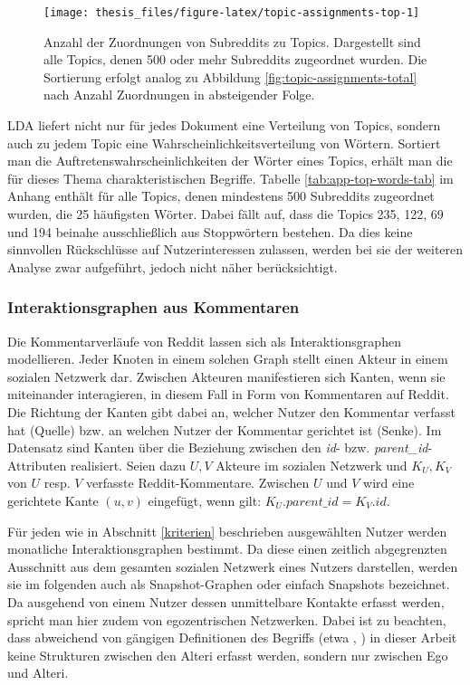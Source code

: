 \documentclass[11pt,a4paper,twoside]{article}
\begin{document}
\begin{figure}

{\centering \texttt{[image: thesis\_files/figure-latex/topic-assignments-top-1]} 

}

\caption{Anzahl der Zuordnungen von Subreddits zu
Topics. Dargestellt sind alle Topics, denen 500 oder mehr Subreddits
zugeordnet wurden. Die Sortierung erfolgt analog zu Abbildung
\ref{fig:topic-assignments-total} nach Anzahl Zuordnungen in
absteigender Folge.}\label{fig:topic-assignments-top}
\end{figure}

LDA liefert nicht nur für jedes Dokument eine Verteilung von Topics,
sondern auch zu jedem Topic eine Wahrscheinlichkeitsverteilung von
Wörtern. Sortiert man die Auftretenswahrscheinlichkeiten der Wörter
eines Topics, erhält man die für dieses Thema charakteristischen
Begriffe. Tabelle \ref{tab:app-top-words-tab} im Anhang enthält für alle
Topics, denen mindestens 500 Subreddits zugeordnet wurden, die 25
häufigsten Wörter. Dabei fällt auf, dass die Topics 235, 122, 69 und 194
beinahe ausschließlich aus Stoppwörtern bestehen. Da dies keine
sinnvollen Rückschlüsse auf Nutzerinteressen zulassen, werden bei sie
der weiteren Analyse zwar aufgeführt, jedoch nicht näher berücksichtigt.

\hypertarget{interaktionsgraphen-aus-kommentaren}{%
\subsubsection{Interaktionsgraphen aus
Kommentaren}\label{interaktionsgraphen-aus-kommentaren}}

Die Kommentarverläufe von Reddit lassen sich als Interaktionsgraphen
modellieren. Jeder Knoten in einem solchen Graph stellt einen Akteur in
einem sozialen Netzwerk dar. Zwischen Akteuren manifestieren sich
Kanten, wenn sie miteinander interagieren, in diesem Fall in Form von
Kommentaren auf Reddit. Die Richtung der Kanten gibt dabei an, welcher
Nutzer den Kommentar verfasst hat (Quelle) bzw. an welchen Nutzer der
Kommentar gerichtet ist (Senke). Im Datensatz sind Kanten über die
Beziehung zwischen den \emph{id}- bzw. \emph{parent\_id}-Attributen
realisiert. Seien dazu \(U, V\) Akteure im sozialen Netzwerk und
\(K_U, K_V\) von \(U\) resp. \(V\) verfasste Reddit-Kommentare. Zwischen
\(U\) und \(V\) wird eine gerichtete Kante \((u,v)\) eingefügt, wenn
gilt: \(K_{U}.parent\_id = K_{V}.id\).

Für jeden wie in Abschnitt \ref{kriterien} beschrieben ausgewählten
Nutzer werden monatliche Interaktionsgraphen bestimmt. Da diese einen
zeitlich abgegrenzten Ausschnitt aus dem gesamten sozialen Netzwerk
eines Nutzers darstellen, werden sie im folgenden auch als
Snapshot-Graphen oder einfach Snapshots bezeichnet. Da ausgehend von
einem Nutzer dessen unmittelbare Kontakte erfasst werden, spricht man
hier zudem von egozentrischen Netzwerken. Dabei ist zu beachten, dass
abweichend von gängigen Definitionen des Begriffs (etwa \autocite[S.
42]{Wasserman1994}, \autocite{Wolf2010}) in dieser Arbeit keine
Strukturen zwischen den Alteri erfasst werden, sondern nur zwischen Ego
und Alteri.
\end{document}
